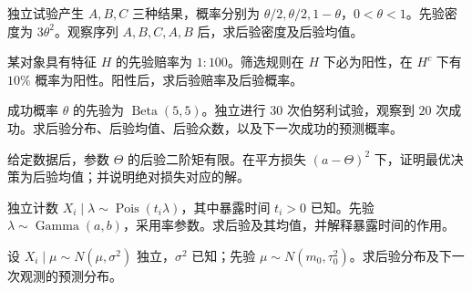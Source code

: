 \begin{exercise}[三类别观察的贝叶斯更新]\label{q:M-E2-II2}
独立试验产生 $A,B,C$ 三种结果，概率分别为 $\theta/2,\theta/2,1-\theta$，$0<\theta<1$。先验密度为 $3\theta^2$。观察序列 $A,B,C,A,B$ 后，求后验密度及后验均值。\par{}\end{exercise}

\begin{exercise}[先验赔率与后验赔率]\label{q:M-E2-II3}
某对象具有特征 $H$ 的先验赔率为 $1:100$。筛选规则在 $H$ 下必为阳性，在 $H^c$ 下有 $10\%$ 概率为阳性。阳性后，求后验赔率及后验概率。\par{}\end{exercise}

\begin{exercise}[贝塔与二项共轭]\label{q:M-F-C14}
成功概率 $\theta$ 的先验为 $\operatorname{Beta}(5,5)$。独立进行 $30$ 次伯努利试验，观察到 $20$ 次成功。求后验分布、后验均值、后验众数，以及下一次成功的预测概率。\par{}\end{exercise}

\begin{exercise}[平方损失下的贝叶斯估计]\label{q:B12.1}
给定数据后，参数 $\Theta$ 的后验二阶矩有限。在平方损失 $(a-\Theta)^2$ 下，证明最优决策为后验均值；并说明绝对损失对应的解。\par{}\end{exercise}

\begin{exercise}[伽马与泊松共轭的多次观察]\label{q:B12.2}
独立计数 $X_i\mid\lambda\sim\operatorname{Pois}(t_i\lambda)$，其中暴露时间 $t_i>0$ 已知。先验 $\lambda\sim\operatorname{Gamma}(a,b)$，采用率参数。求后验及其均值，并解释暴露时间的作用。\par{}\end{exercise}

\begin{exercise}[正态均值的共轭更新]\label{q:B12.3}
设 $X_i\mid\mu\sim N(\mu,\sigma^2)$ 独立，$\sigma^2$ 已知；先验 $\mu\sim N(m_0,\tau_0^2)$。求后验分布及下一次观测的预测分布。\par{}\end{exercise}

